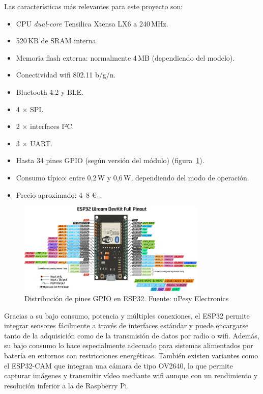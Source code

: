 \begin{itemize}
    Las características más relevantes para este proyecto son:
    \begin{itemize}
        \item CPU \emph{dual-core} Tensilica Xtensa LX6 a 240\,MHz.
        \item 520\,KB de SRAM interna.
        \item Memoria flash externa: normalmente 4\,MB (dependiendo del modelo).
        \item Conectividad wifi 802.11 b/g/n.
        \item Bluetooth 4.2 y BLE.
        \item 4 × SPI.
        \item 2 × interfaces I²C.
        \item 3 × UART.
        \item Hasta 34 pines GPIO (según versión del módulo) (figura~\ref{fig:esp32gpio}).
        \item Consumo típico: entre 0,2\,W y 0,6\,W, dependiendo del modo de operación.
        \item Precio aproximado: 4–8 \euro~\cite{esp32}.
    \end{itemize}
    \begin{figure}[h]
        \centering
        \includegraphics[width=0.8\textwidth]{Imagenes/Bitmap/esp32gpio}
        \caption{Distribución de pines GPIO en ESP32. Fuente: uPesy Electronics~\cite{upesy_esp32_pinout}}
        \label{fig:esp32gpio}
    \end{figure}

    Gracias a su bajo consumo, potencia y múltiples conexiones, el ESP32 permite integrar sensores fácilmente a través de interfaces estándar y puede encargarse tanto de la adquisición como de la transmisión de datos por radio o wifi.
    Además, su bajo consumo lo hace especialmente adecuado para sistemas alimentados por batería en entornos con restricciones energéticas.
    También existen variantes como el ESP32-CAM que integran una cámara de tipo OV2640, lo que permite capturar imágenes y transmitir vídeo mediante wifi
    aunque con un rendimiento y resolución inferior a la de Raspberry Pi.


\end{itemize}
